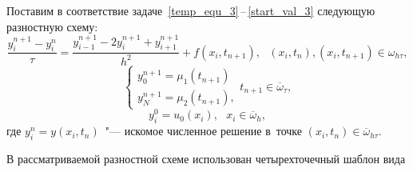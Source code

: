 \documentclass[11pt,a4paper,twoside]{report}
\numberwithin{equation}{section}
\theoremstyle{definition}
\theoremstyle{plain}
\begin{document}
Поставим в соответствие задаче~\eqref{temp_equ_3}\,--\,\eqref{start_val_3}
следующую разностную схему:
%
\begin{equation}
%
    \label{diskr_temp_equ_2-2}
    \frac{y_i^{n+1} - y_i^n}{\tau} = \frac{y_{i-1}^{n+1} - 2y_i^{n+1} + y_{i+1}^{n+1}}{h^2}
    + f(x_i,t_{n+1}),~~~(x_i, t_n), (x_i, t_{n+1})\in \omega_{h\tau},
%
\end{equation}
%
%
\begin{equation}
%
    \label{bord_diskr_2-2}
    \begin{cases}
        y_0^{n+1} = \mu_1(t_{n+1}) \\
        y_N^{n+1} = \mu_2(t_{n+1}),
    \end{cases}
    t_{n+1}\in \overline{\omega}_{\tau},
%
\end{equation}
%
%
\begin{equation}
%
    \label{start_diskr_2-2}
    y_i^0 = u_0(x_i),~~~x_i\in \overline{\omega}_h,
%
\end{equation}
%
где $y_i^n = y(x_i, t_n)$~"--- искомое численное решение
в~точке $(x_i, t_n) \in \overline{\omega}_{h\tau}$.

В рассматриваемой разностной схеме использован четырехточечный шаблон вида
\end{document}
